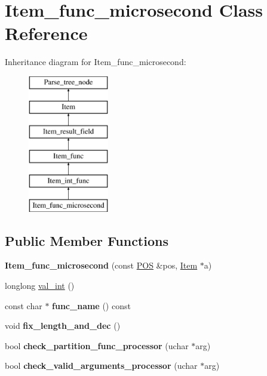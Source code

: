 \hypertarget{classItem__func__microsecond}{}\section{Item\+\_\+func\+\_\+microsecond Class Reference}
\label{classItem__func__microsecond}
Inheritance diagram for Item\+\_\+func\+\_\+microsecond\+:\begin{figure}[H]
\begin{center}
\leavevmode
\includegraphics[height=6.000000cm]{classItem__func__microsecond}
\end{center}
\end{figure}
\subsection*{Public Member Functions}
\begin{DoxyCompactItemize}
\item 
\mbox{\label{classItem__func__microsecond_a9e92601eca96551a0f37451bf1ec8b9b}} 
{\bfseries Item\+\_\+func\+\_\+microsecond} (const \mbox{\hyperlink{structYYLTYPE}{P\+OS}} \&pos, \mbox{\hyperlink{classItem}{Item}} $\ast$a)
\item 
longlong \mbox{\hyperlink{classItem__func__microsecond_a403605632409cffe230b4586f567ab98}{val\+\_\+int}} ()
\item 
\mbox{\label{classItem__func__microsecond_af07bec207ef01233add5073829e31195}} 
const char $\ast$ {\bfseries func\+\_\+name} () const
\item 
\mbox{\label{classItem__func__microsecond_a349ee8f4334713e595a575a603635919}} 
void {\bfseries fix\+\_\+length\+\_\+and\+\_\+dec} ()
\item 
\mbox{\label{classItem__func__microsecond_ad9b9352e7a1300d00f7067134264e661}} 
bool {\bfseries check\+\_\+partition\+\_\+func\+\_\+processor} (uchar $\ast$arg)
\item 
\mbox{\label{classItem__func__microsecond_a0abd073d501d7c344353e75ec8a87540}} 
bool {\bfseries check\+\_\+valid\+\_\+arguments\+\_\+processor} (uchar $\ast$arg)
\end{DoxyCompactItemize}
